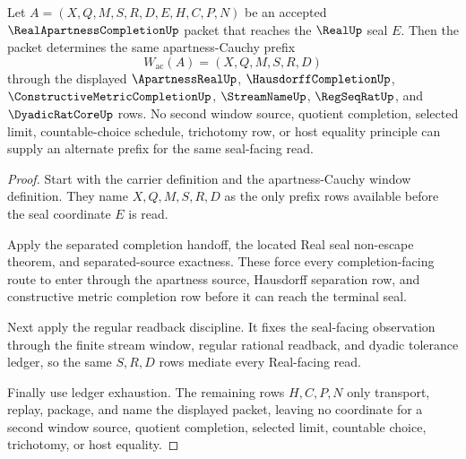 \begin{theorem}
\label{thm:real-apartness-completion-window-determinacy}
Let $A=(X,Q,M,S,R,D,E,H,C,P,N)$ be an accepted $\RealApartnessCompletionUp$ packet that reaches the $\RealUp$ seal $E$. Then the packet determines the same apartness-Cauchy prefix
$$
W_{\mathrm{ac}}(A)=(X,Q,M,S,R,D)
$$
through the displayed $\ApartnessRealUp$, $\HausdorffCompletionUp$, $\ConstructiveMetricCompletionUp$, $\StreamNameUp$, $\RegSeqRatUp$, and $\DyadicRatCoreUp$ rows. No second window source, quotient completion, selected limit, countable-choice schedule, trichotomy row, or host equality principle can supply an alternate prefix for the same seal-facing read.
\end{theorem}
\begin{proof}
Start with the carrier definition and the apartness-Cauchy window definition. They name $X,Q,M,S,R,D$ as the only prefix rows available before the seal coordinate $E$ is read.

Apply the separated completion handoff, the located Real seal non-escape theorem, and separated-source exactness. These force every completion-facing route to enter through the apartness source, Hausdorff separation row, and constructive metric completion row before it can reach the terminal seal.

Next apply the regular readback discipline. It fixes the seal-facing observation through the finite stream window, regular rational readback, and dyadic tolerance ledger, so the same $S,R,D$ rows mediate every Real-facing read.

Finally use ledger exhaustion. The remaining rows $H,C,P,N$ only transport, replay, package, and name the displayed packet, leaving no coordinate for a second window source, quotient completion, selected limit, countable choice, trichotomy, or host equality.
\end{proof}


